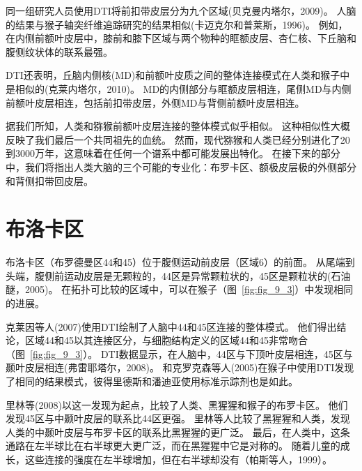 同一组研究人员使用DTI将前扣带皮层分为九个区域(贝克曼内塔尔，2009)。
人脑的结果与猴子轴突纤维追踪研究的结果相似(卡迈克尔和普莱斯，1996)。
例如，在内侧前额叶皮层中，膝前和膝下区域与两个物种的眶额皮层、杏仁核、下丘脑和腹侧纹状体的联系最强。
\par


DTI还表明，丘脑内侧核(MD)和前额叶皮质之间的整体连接模式在人类和猴子中是相似的(克莱内塔尔，2010)。
MD的内侧部分与眶额皮层相连，尾侧MD与内侧前额叶皮层相连，包括前扣带皮层，外侧MD与背侧前额叶皮层相连。
\par


据我们所知，人类和猕猴前额叶皮层连接的整体模式似乎相似。
这种相似性大概反映了我们最后一个共同祖先的血统。
然而，现代猕猴和人类已经分别进化了20到3000万年，这意味着在任何一个谱系中都可能发展出特化。
在接下来的部分中，我们将指出人类大脑的三个可能的专业化：布罗卡区、额极皮层极的外侧部分和背侧扣带回皮层。



\section{布洛卡区}

布洛卡区（布罗德曼区44和45）位于腹侧运动前皮层（区域6）的前面。
从尾端到头端，腹侧前运动皮层是无颗粒的，44区是异常颗粒状的，45区是颗粒状的(石油醚，2005)。
在拓扑可比较的区域中，可以在猴子（图~\ref{fig:fig_9_3}）中发现相同的进展。
\par


克莱因等人(2007)使用DTI绘制了人脑中44和45区连接的整体模式。
他们得出结论，区域44和45以其连接区分，与细胞结构定义的区域44和45非常吻合（图~\ref{fig:fig_9_3}）。
DTI数据显示，在人脑中，44区与下顶叶皮层相连，45区与颞叶皮层相连(弗雷耶塔尔，2008)。
和克罗克森等人(2005)在猴子中使用DTI发现了相同的结果模式，彼得里德斯和潘迪亚使用标准示踪剂也是如此。
\par


里林等(2008)以这一发现为起点，比较了人类、黑猩猩和猴子的布罗卡区。
他们发现45区与中颞叶皮层的联系比44区更强。
里林等人比较了黑猩猩和人类，发现人类的中颞叶皮层与布罗卡区的联系比黑猩猩的更广泛。
最后，在人类中，这条通路在左半球比在右半球更大更广泛，而在黑猩猩中它是对称的。
随着儿童的成长，这些连接的强度在左半球增加，但在右半球却没有（帕斯等人，1999）。
\par


